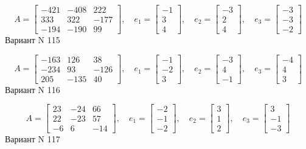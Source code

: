 \documentclass[11pt]{report}
\begin{document}
$$A = \left[\begin{matrix}-421 & -408 & 222\\333 & 322 & -177\\-194 & -190 & 99\end{matrix}\right],\quad e_1 = \left[\begin{matrix}-1\\3\\4\end{matrix}\right],\quad e_2 = \left[\begin{matrix}-3\\2\\4\end{matrix}\right],\quad e_3 = \left[\begin{matrix}-3\\-3\\-2\end{matrix}\right]$$Вариант N 115

$$A = \left[\begin{matrix}-163 & 126 & 38\\-234 & 93 & -126\\205 & -135 & 40\end{matrix}\right],\quad e_1 = \left[\begin{matrix}-1\\-2\\3\end{matrix}\right],\quad e_2 = \left[\begin{matrix}-3\\4\\-1\end{matrix}\right],\quad e_3 = \left[\begin{matrix}-4\\4\\3\end{matrix}\right]$$Вариант N 116

$$A = \left[\begin{matrix}23 & -24 & 66\\22 & -23 & 57\\-6 & 6 & -14\end{matrix}\right],\quad e_1 = \left[\begin{matrix}-2\\-1\\-2\end{matrix}\right],\quad e_2 = \left[\begin{matrix}3\\1\\2\end{matrix}\right],\quad e_3 = \left[\begin{matrix}3\\-1\\-3\end{matrix}\right]$$Вариант N 117
\end{document}

